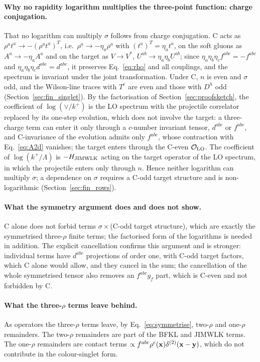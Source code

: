 \paragraph{Why no rapidity logarithm multiplies the three-point function: charge conjugation.} That no logarithm can multiply $\sigma$ follows from charge conjugation. C acts as $\rho^at^a\to-(\rho^at^a)^T$, i.e.\ $\rho^a\to-\eta_a\rho^a$ with $(t^a)^T=\eta_at^a$, on the soft gluons as $A^a\to-\eta_aA^a$ and on the target as $V\to V^*$, $U^{ab}\to\eta_a\eta_bU^{ab}$; since $\eta_a\eta_b\eta_cf^{abc}=-f^{abc}$ and $\eta_a\eta_b\eta_cd^{abc}=d^{abc}$, it preserves Eq.~\eqref{eq:rho} and all couplings, and the spectrum is invariant under the joint transformation. Under C, $n$ is even and $\sigma$ odd, and the Wilson-line traces with $T^e$ are even and those with $D^h$ odd (Section~\ref{sec:fin_singlet}). By the factorisation of Section~\ref{sec:proofsketch}, the coefficient of $\log(\vee/k^+)$ is the LO spectrum with the projectile correlator replaced by its one-step evolution, which does not involve the target: a three-charge term can enter it only through a $c$-number invariant tensor, $d^{abc}$ or $f^{abc}$, and C-invariance of the evolution admits only $f^{abc}$, whose contraction with Eq.~\eqref{eq:A2d} vanishes; the target enters through the C-even $\mathcal O_{\rm LO}$. The coefficient of $\log(k^+/\Lambda)$ is $-H_{\rm JIMWLK}$ acting on the target operator of the LO spectrum, in which the projectile enters only through $n$. Hence neither logarithm can multiply $\sigma$; a dependence on $\sigma$ requires a C-odd target structure and is non-logarithmic (Section~\ref{sec:fin_rows}). 

\paragraph{What the symmetry argument does and does not show.} C alone does not forbid terms $\sigma\times$(C-odd target structure), which are exactly the symmetrised three-$\rho$ finite terms; the factorised form of the logarithms is needed in addition. The explicit cancellation confirms this argument and is stronger: individual terms have $d^{abc}$ projections of order one, with C-odd target factors, which C alone would allow, and they cancel in the sum; the cancellation of the whole symmetrised tensor also removes an $f^{abc}g_f$ part, which is C-even and not forbidden by C. 

\paragraph{What the three-$\rho$ terms leave behind.} As operators the three-$\rho$ terms leave, by Eq.~\eqref{eq:symmetrise}, two-$\rho$ and one-$\rho$ remainders. The two-$\rho$ remainders are part of the BFKL and JIMWLK terms. The one-$\rho$ remainders are contact terms $\propto f^{abc}\rho^c(\mathbf{x})\delta^{(2)}(\mathbf{x}-\mathbf{y})$, which do not contribute in the colour-singlet form.

